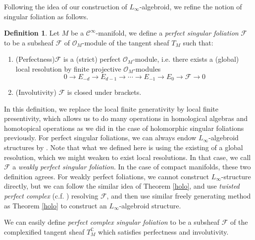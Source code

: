 \documentclass[12pt]{amsart}
\theoremstyle{definition}
\newtheorem{defn}[thm]{Definition}
\theoremstyle{remark}
\numberwithin{equation}{section}
\newcommand{\CF}{{\mathcal F}}
\newcommand{\CO}{{\mathcal O}}
\newcommand{\cinf}{{\mathcal C}^{\infty}}
\newcommand{\C}{{\mathbb{C}}}
\newcommand{\1}{{\mathbb{1}}}
\begin{document}
Following the idea of our construction of $L_{\infty}$-algebroid, we refine the notion of singular foliation as follows.
\begin{defn}
    Let $M$ be a $\cinf$-manifold, we define a {\it perfect singular foliation} $\CF$ to be a subsheaf $\CF$ of $\CO_M$-module of the tangent sheaf $T_M$ such that:
    \begin{enumerate}
        \item (Perfectness)$\CF$ is a (strict) perfect $\CO_M$-module, i.e. there exists a (global) local resolution by finite projective $\CO_M$-modules
        \begin{equation*}
            0\to E_{-d}\to E_{d-1}\to \cdots \to E_{-1}\to E_0 \to \CF \to 0  
        \end{equation*}
        \item (Involutivity) $\CF$ is closed under brackets.
    \end{enumerate}
\end{defn}
In this definition, we replace the local finite generativity by local finite presentivity, which allows us to do many operations in homological algebras and homotopical operations as we did in the case of holomorphic singular foliations previously. For perfect singular foliations, we can always endow $L_{\infty}$-algebroid structures by \cite{LLS20}. Note that what we defined here is using the existing of a global resolution, which we might weaken to exist local resolutions. In that case, we call $\CF$ a {\it weakly perfect singular foliation}. In the case of compact manifolds, these two definition agrees. For weakly perfect foliations, we cannot construct $L_{\infty}$-structure directly, but we can follow the similar idea of Theorem \ref{holo}, and use {\it twisted perfect complex} (c.f. \cite{Wei16}\cite{TT76}) resolving $\CF$, and then use similar freely generating method as Theorem \ref{holo} to construct an $L_{\infty}$-algebroid structure.

We can easily define {\it perfect complex singular foliation} to be a subsheaf $\CF$ of the complexified tangent sheaf $T^{\C}_M$ which satisfies perfectness and involutivity.
\end{document}
